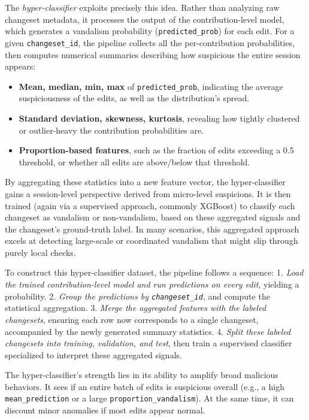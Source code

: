 \documentclass[
    13pt, %
    a4paper, %
    twoside, 
    DIV14, %
    listof=totoc, %
    bibliography=totoc, %
    index=totoc, %
    headsepline
]{scrreprt}
\begin{document}
The \emph{hyper-classifier} exploits precisely this idea. Rather than analyzing raw changeset metadata, it processes the output of the contribution-level model, which generates a vandalism probability (\texttt{predicted\_prob}) for each edit. For a given \texttt{changeset\_id}, the pipeline collects all the per-contribution probabilities, then computes numerical summaries describing how suspicious the entire session appears:
\begin{itemize}
    \item \textbf{Mean, median, min, max} of \texttt{predicted\_prob}, indicating the average suspiciousness of the edits, as well as the distribution’s spread.
    \item \textbf{Standard deviation, skewness, kurtosis}, revealing how tightly clustered or outlier-heavy the contribution probabilities are.
    \item \textbf{Proportion-based features}, such as the fraction of edits exceeding a 0.5 threshold, or whether all edits are above/below that threshold. 
\end{itemize}
By aggregating these statistics into a new feature vector, the hyper-classifier gains a session-level perspective derived from micro-level suspicions. It is then trained (again via a supervised approach, commonly XGBoost) to classify each changeset as vandalism or non-vandalism, based on these aggregated signals and the changeset’s ground-truth label. In many scenarios, this aggregated approach excels at detecting large-scale or coordinated vandalism that might slip through purely local checks.

To construct this hyper-classifier dataset, the pipeline follows a sequence:  
1. \emph{Load the trained contribution-level model and run predictions on every edit}, yielding a probability.  
2. \emph{Group the predictions by \texttt{changeset\_id}}, and compute the statistical aggregation.  
3. \emph{Merge the aggregated features with the labeled changesets}, ensuring each row now corresponds to a single changeset, accompanied by the newly generated summary statistics.  
4. \emph{Split these labeled changesets into training, validation, and test}, then train a supervised classifier specialized to interpret these aggregated signals.

The hyper-classifier’s strength lies in its ability to amplify broad malicious behaviors. It sees if an entire batch of edits is suspicious overall (e.g., a high \texttt{mean\_prediction} or a large \texttt{proportion\_vandalism}). At the same time, it can discount minor anomalies if most edits appear normal. 
\end{document}
